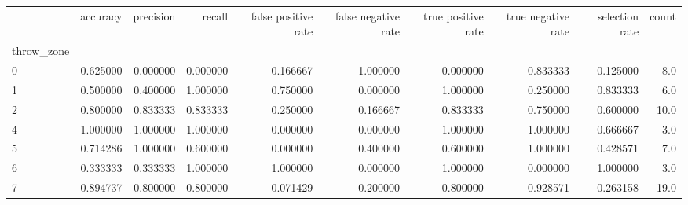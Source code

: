 \begin{tabular}{lrrrrrrrrr}
\toprule
{} &  accuracy &  precision &    recall &  false positive rate &  false negative rate &  true positive rate &  true negative rate &  selection rate &  count \\
throw\_zone &           &            &           &                      &                      &                     &                     &                 &        \\
\midrule
0          &  0.625000 &   0.000000 &  0.000000 &             0.166667 &             1.000000 &            0.000000 &            0.833333 &        0.125000 &    8.0 \\
1          &  0.500000 &   0.400000 &  1.000000 &             0.750000 &             0.000000 &            1.000000 &            0.250000 &        0.833333 &    6.0 \\
2          &  0.800000 &   0.833333 &  0.833333 &             0.250000 &             0.166667 &            0.833333 &            0.750000 &        0.600000 &   10.0 \\
4          &  1.000000 &   1.000000 &  1.000000 &             0.000000 &             0.000000 &            1.000000 &            1.000000 &        0.666667 &    3.0 \\
5          &  0.714286 &   1.000000 &  0.600000 &             0.000000 &             0.400000 &            0.600000 &            1.000000 &        0.428571 &    7.0 \\
6          &  0.333333 &   0.333333 &  1.000000 &             1.000000 &             0.000000 &            1.000000 &            0.000000 &        1.000000 &    3.0 \\
7          &  0.894737 &   0.800000 &  0.800000 &             0.071429 &             0.200000 &            0.800000 &            0.928571 &        0.263158 &   19.0 \\
\bottomrule
\end{tabular}

